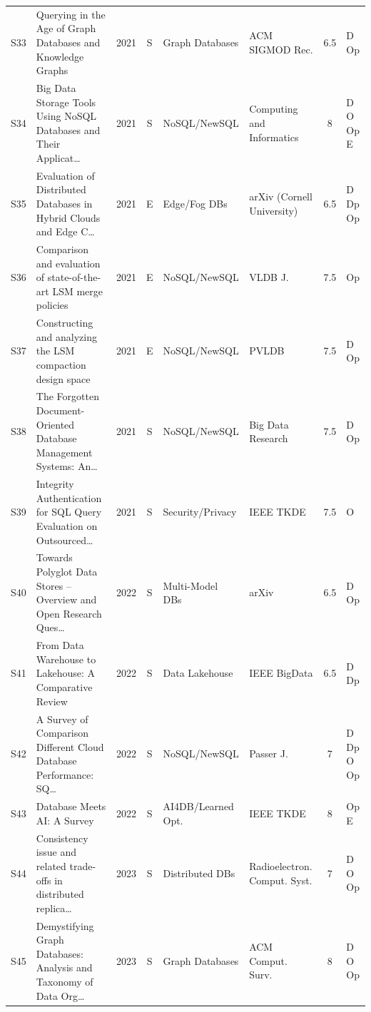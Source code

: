 \documentclass[a4paper,fleqn]{cas-sc}
\begin{document}
\begin{landscape}
\begin{longtable}{c p{3.5cm} c c p{2.45cm} p{2.3cm} c p{1.5cm}}
\addlinespace
S33 & Querying in the Age of Graph Databases and Knowledge Graphs~\cite{Arenas2021GraphDB} & 2021 & S & Graph Databases & ACM SIGMOD Rec. & 6.5 & D Op \\
\addlinespace
S34 & Big Data Storage Tools Using NoSQL Databases and Their Applicat\ldots{}~\cite{Faridoon2021NoSQL} & 2021 & S & NoSQL/NewSQL & Computing and Informatics & 8 & D O Op E \\
\addlinespace
S35 & Evaluation of Distributed Databases in Hybrid Clouds and Edge C\ldots{}~\cite{Mansouri2021EdgeFog} & 2021 & E & Edge/Fog DBs & arXiv (Cornell University) & 6.5 & D Dp Op \\
\addlinespace
S36 & Comparison and evaluation of state-of-the-art LSM merge policies~\cite{Mao2021NoSQL} & 2021 & E & NoSQL/NewSQL & VLDB J. & 7.5 & Op \\
\addlinespace
S37 & Constructing and analyzing the LSM compaction design space~\cite{Sarkar2021NoSQL} & 2021 & E & NoSQL/NewSQL & PVLDB & 7.5 & D Op \\
\addlinespace
S38 & The Forgotten Document-Oriented Database Management Systems: An\ldots{}~\cite{Truica2021NoSQL} & 2021 & S & NoSQL/NewSQL & Big Data Research & 7.5 & D Op \\
\addlinespace
S39 & Integrity Authentication for SQL Query Evaluation on Outsourced\ldots{}~\cite{Zhang2021Sec} & 2021 & S & Security/Privacy & IEEE TKDE & 7.5 & O \\
\addlinespace
S40 & Towards Polyglot Data Stores -- Overview and Open Research Ques\ldots{}~\cite{Glake2022MultiModel} & 2022 & S & Multi-Model DBs & arXiv & 6.5 & D Op \\
\addlinespace
S41 & From Data Warehouse to Lakehouse: A Comparative Review~\cite{Harby2022Lakehouse} & 2022 & S & Data Lakehouse & IEEE BigData & 6.5 & D Dp \\
\addlinespace
S42 & A Survey of Comparison Different Cloud Database Performance: SQ\ldots{}~\cite{Shareef2022NoSQL} & 2022 & S & NoSQL/NewSQL & Passer J. & 7 & D Dp O Op \\
\addlinespace
S43 & Database Meets AI: A Survey~\cite{Zhou2022AI4DB} & 2022 & S & AI4DB/Learned Opt. & IEEE TKDE & 8 & Op E \\
\addlinespace
S44 & Consistency issue and related trade-offs in distributed replica\ldots{}~\cite{Ahmed2023DistDB} & 2023 & S & Distributed DBs & Radioelectron. Comput. Syst. & 7 & D O Op \\
\addlinespace
S45 & Demystifying Graph Databases: Analysis and Taxonomy of Data Org\ldots{}~\cite{Besta2023GraphDB} & 2023 & S & Graph Databases & ACM Comput. Surv. & 8 & D O Op \\

\end{longtable}
\end{landscape}
\end{document}
